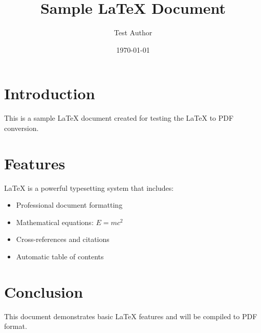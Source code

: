 \documentclass{article}
\title{Sample LaTeX Document}
\author{Test Author}
\date{\today}
\begin{document}
\maketitle

\section{Introduction}
This is a sample LaTeX document created for testing the LaTeX to PDF conversion.

\section{Features}
LaTeX is a powerful typesetting system that includes:
\begin{itemize}
    \item Professional document formatting
    \item Mathematical equations: $E = mc^2$
    \item Cross-references and citations
    \item Automatic table of contents
\end{itemize}

\section{Conclusion}
This document demonstrates basic LaTeX features and will be compiled to PDF format.
\end{document}
